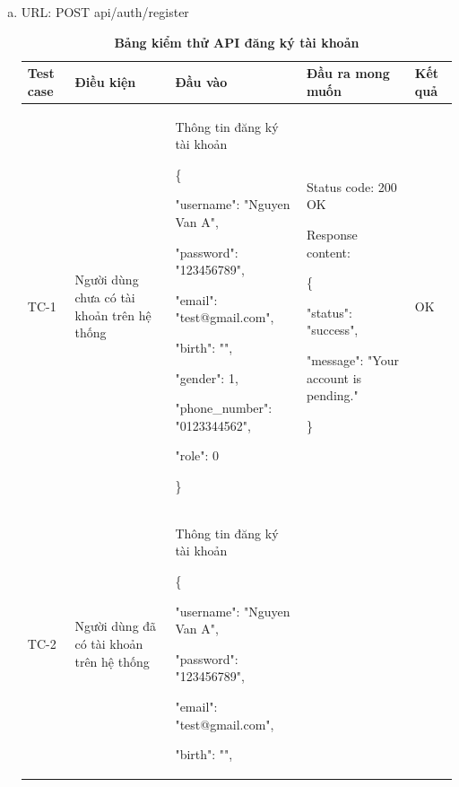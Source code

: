 \begin{enumerate}[a)]
  \item URL: POST api/auth/register
  
  \break
  \begin{xltabular}{\textwidth}{
    | >{\raggedright\arraybackslash}p{1cm}
    | >{\raggedright\arraybackslash}p{2.5cm}
    | >{\raggedright\arraybackslash}X
    | >{\raggedright\arraybackslash}X
    | >{\raggedright\arraybackslash}p{1cm}|
    }
    \caption{\bfseries \fontsize{12pt}{0pt}\selectfont Bảng kiểm thử API đăng ký tài khoản}
    \\
    \hline
    \bfseries Test case    &\bfseries Điều kiện   &\bfseries Đầu vào 
    &\bfseries Đầu ra mong muốn &\bfseries Kết quả\\ \hline
  
  
    TC-1
    & Người dùng chưa có tài khoản trên hệ thống
    & Thông tin đăng ký tài khoản

    \{

    "username": "Nguyen Van A",

    "password": "123456789",

    "email": "test@gmail.com",

    "birth": "",

    "gender": 1,

    "phone\_number": "0123344562",

    "role": 0

   \}
  
    & 
  
    Status code: 200 OK
  
      Response content:
  
      \{
  
    "status": "success",
  
    "message": "Your account is pending."
  
    \}
    
    & OK
  
    \\ \hline
  
    TC-2
    & Người dùng đã có tài khoản trên hệ thống
    & Thông tin đăng ký tài khoản

    \{

    "username": "Nguyen Van A",

    "password": "123456789",

    "email": "test@gmail.com",

    "birth": "",


\end{xltabular}
\end{enumerate}
